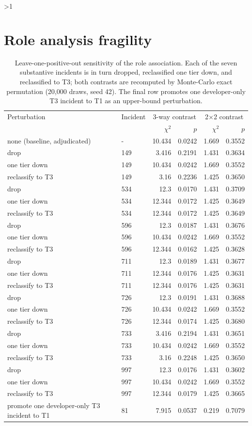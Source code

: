 \documentclass[11pt]{article}
\let\oldsection\section
\newcounter{supsec}
\renewcommand{\section}[1]{\stepcounter{supsec}\ifnum\value{supsec}>1\clearpage\fi\oldsection*{#1}}
\begin{document}
\section{Role analysis fragility}
\begin{table}[H]
\caption{Leave-one-positive-out sensitivity of the role association. Each of the seven substantive incidents is in turn dropped, reclassified one tier down, and reclassified to T3; both contrasts are recomputed by Monte-Carlo exact permutation (20{,}000 draws, seed 42). The final row promotes one developer-only T3 incident to T1 as an upper-bound perturbation.}
\centering\small
\begin{tabular}{@{}llrrrr@{}}
\toprule
Perturbation & Incident & \multicolumn{2}{c}{3-way contrast} & \multicolumn{2}{c}{2$\times$2 contrast} \\
 & & $\chi^2$ & $p$ & $\chi^2$ & $p$ \\ \midrule
none (baseline, adjudicated) & - & 10.434 & 0.0242 & 1.669 & 0.3552 \\
drop & 149 & 3.416 & 0.2191 & 1.431 & 0.3634 \\
one tier down & 149 & 10.434 & 0.0242 & 1.669 & 0.3552 \\
reclassify to T3 & 149 & 3.16 & 0.2236 & 1.425 & 0.3650 \\
drop & 534 & 12.3 & 0.0170 & 1.431 & 0.3709 \\
one tier down & 534 & 12.344 & 0.0172 & 1.425 & 0.3649 \\
reclassify to T3 & 534 & 12.344 & 0.0172 & 1.425 & 0.3649 \\
drop & 596 & 12.3 & 0.0187 & 1.431 & 0.3676 \\
one tier down & 596 & 10.434 & 0.0242 & 1.669 & 0.3552 \\
reclassify to T3 & 596 & 12.344 & 0.0162 & 1.425 & 0.3628 \\
drop & 711 & 12.3 & 0.0189 & 1.431 & 0.3677 \\
one tier down & 711 & 12.344 & 0.0176 & 1.425 & 0.3631 \\
reclassify to T3 & 711 & 12.344 & 0.0176 & 1.425 & 0.3631 \\
drop & 726 & 12.3 & 0.0191 & 1.431 & 0.3688 \\
one tier down & 726 & 10.434 & 0.0242 & 1.669 & 0.3552 \\
reclassify to T3 & 726 & 12.344 & 0.0174 & 1.425 & 0.3680 \\
drop & 733 & 3.416 & 0.2194 & 1.431 & 0.3651 \\
one tier down & 733 & 10.434 & 0.0242 & 1.669 & 0.3552 \\
reclassify to T3 & 733 & 3.16 & 0.2248 & 1.425 & 0.3650 \\
drop & 997 & 12.3 & 0.0176 & 1.431 & 0.3602 \\
one tier down & 997 & 10.434 & 0.0242 & 1.669 & 0.3552 \\
reclassify to T3 & 997 & 12.344 & 0.0179 & 1.425 & 0.3665 \\
promote one developer-only T3 incident to T1 & 81 & 7.915 & 0.0537 & 0.219 & 0.7079 \\
\bottomrule
\end{tabular}
\end{table}
\end{document}

